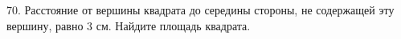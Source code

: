 70. Расстояние от вершины квадрата до середины стороны, не содержащей эту вершину, равно 3 см. Найдите площадь квадрата.\\
